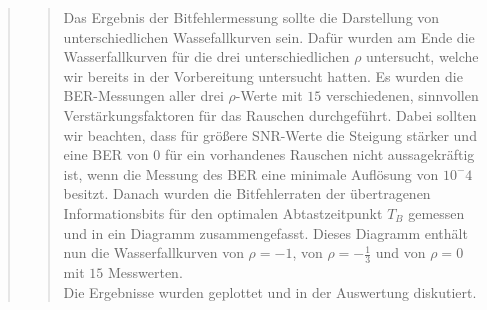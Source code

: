 \begin{quote}
\begin{quote}
        Das Ergebnis der Bitfehlermessung sollte die Darstellung von
        unterschiedlichen Wassefallkurven sein. Dafür wurden am Ende die
        Wasserfallkurven für die drei unterschiedlichen $\rho$ untersucht,
        welche wir bereits in der Vorbereitung untersucht hatten. Es wurden die
        BER-Messungen aller drei $\rho$-Werte mit $15$ verschiedenen, sinnvollen
        Verstärkungsfaktoren für das Rauschen durchgeführt. Dabei sollten wir
        beachten, dass für größere SNR-Werte die Steigung stärker und eine BER
        von $0$ für ein vorhandenes Rauschen nicht aussagekräftig ist, wenn die
        Messung des BER eine minimale Auflösung von $10^-4$ besitzt. Danach
        wurden die Bitfehlerraten der übertragenen Informationsbits für
        den optimalen Abtastzeitpunkt $T_B$ gemessen und in ein Diagramm
        zusammengefasst. Dieses Diagramm enthält nun die Wasserfallkurven von
        $\rho = -1$, von $\rho = -\frac{1}{3}$ und von $\rho = 0$ mit $15$
        Messwerten.\\
        Die Ergebnisse wurden geplottet und in der Auswertung diskutiert.  
          
    \end{quote}%

\end{quote}%


    
